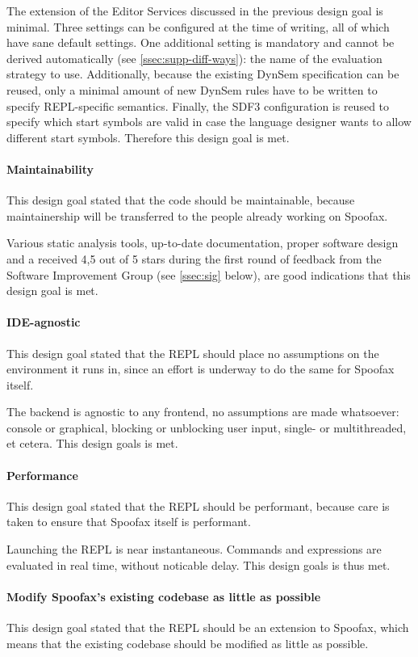 The extension of the Editor Services discussed in the previous design goal is
minimal. Three settings can be configured at the time of writing, all of which
have sane default settings. One additional setting is mandatory and cannot be
derived automatically (see \cref{ssec:supp-diff-ways}): the name of the
evaluation strategy to use. Additionally, because the existing DynSem
specification can be reused, only a minimal amount of new DynSem rules have to
be written to specify REPL-specific semantics. Finally, the SDF3 configuration
is reused to specify which start symbols are valid in case the language designer
wants to allow different start symbols. Therefore this design goal is met.

\paragraph{Maintainability} This design goal stated that the code should be
maintainable, because maintainership will be transferred to the people already
working on Spoofax.

Various static analysis tools, up-to-date documentation, proper software design
and a received 4,5 out of 5 stars during the first round of feedback from the
Software Improvement Group (see \cref{ssec:sig} below), are good indications that
this design goal is met.

\paragraph{IDE-agnostic} This design goal stated that the REPL should place no
assumptions on the environment it runs in, since an effort is underway to do the
same for Spoofax itself.

The backend is agnostic to any frontend, no assumptions are made whatsoever:
console or graphical, blocking or unblocking user input, single- or
multithreaded, et cetera. This design goals is met.

\paragraph{Performance} This design goal stated that the REPL should be
performant, because care is taken to ensure that Spoofax itself is performant.

Launching the REPL is near instantaneous. Commands and expressions are evaluated
in real time, without noticable delay. This design goals is thus met.

\paragraph{Modify Spoofax's existing codebase as little as possible} This design
goal stated that the REPL should be an extension to Spoofax, which means that
the existing codebase should be modified as little as possible.

